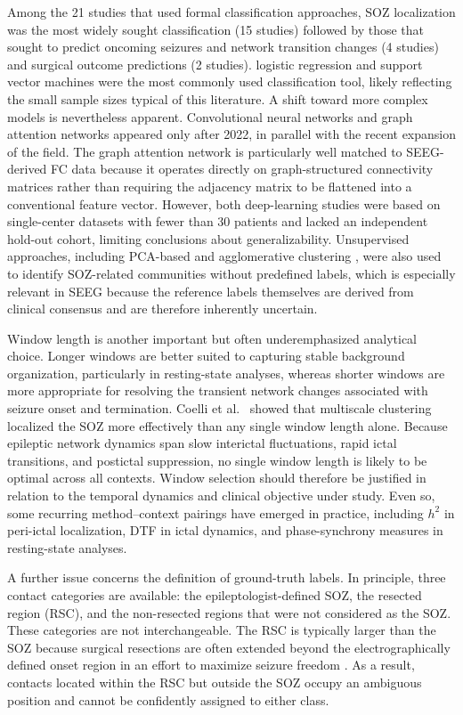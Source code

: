 \documentclass[12pt]{article}
\begin{document}
Among the 21 studies that used formal classification approaches, SOZ localization was the most widely sought classification (15 studies) followed by those that sought to predict oncoming seizures and network transition changes (4 studies) and surgical outcome predictions (2 studies). logistic regression and support vector machines were the most commonly used classification tool, likely reflecting the small sample sizes typical of this literature. A shift toward more complex models is nevertheless apparent. Convolutional neural networks \cite{Doss2024-rs} and graph attention networks \cite{Wang2025-ij} appeared only after 2022, in parallel with the recent expansion of the field. The graph attention network is particularly well matched to SEEG-derived FC data because it operates directly on graph-structured connectivity matrices rather than requiring the adjacency matrix to be flattened into a conventional feature vector. However, both deep-learning studies were based on single-center datasets with fewer than 30 patients and lacked an independent hold-out cohort, limiting conclusions about generalizability. Unsupervised approaches, including PCA-based and agglomerative clustering \cite{Doss2024-ce, Shahabi2023-ak}, were also used to identify SOZ-related communities without predefined labels, which is especially relevant in SEEG because the reference labels themselves are derived from clinical consensus and are therefore inherently uncertain.

Window length is another important but often underemphasized analytical choice. Longer windows are better suited to capturing stable background organization, particularly in resting-state analyses, whereas shorter windows are more appropriate for resolving the transient network changes associated with seizure onset and termination. Coelli et al.\ \cite{Coelli2019-hu} showed that multiscale clustering localized the SOZ more effectively than any single window length alone. Because epileptic network dynamics span slow interictal fluctuations, rapid ictal transitions, and postictal suppression, no single window length is likely to be optimal across all contexts. Window selection should therefore be justified in relation to the temporal dynamics and clinical objective under study. Even so, some recurring method--context pairings have emerged in practice, including $h^2$ in peri-ictal localization, DTF in ictal dynamics, and phase-synchrony measures in resting-state analyses.

A further issue concerns the definition of ground-truth labels. In principle, three contact categories are available: the epileptologist-defined SOZ, the resected region (RSC), and the non-resected regions that were not considered as the SOZ. These categories are not interchangeable. The RSC is typically larger than the SOZ because surgical resections are often extended beyond the electrographically defined onset region in an effort to maximize seizure freedom \cite{Abdallah2026-ue,Vakharia2018-yx}. As a result, contacts located within the RSC but outside the SOZ occupy an ambiguous position and cannot be confidently assigned to either class.
\end{document}
